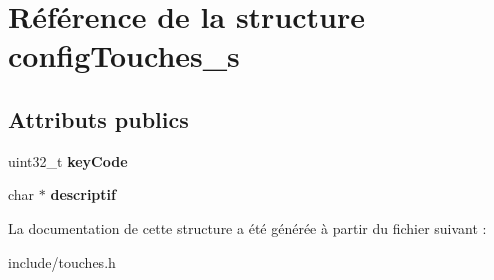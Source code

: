 \hypertarget{structconfigTouches__s}{}\section{Référence de la structure config\+Touches\+\_\+s}
\label{structconfigTouches__s}
\subsection*{Attributs publics}
\begin{DoxyCompactItemize}
\item 
\mbox{\label{structconfigTouches__s_af4b9d9fa7199d941b852eb00e546da13}} 
uint32\+\_\+t {\bfseries key\+Code}
\item 
\mbox{\label{structconfigTouches__s_ac3831fa6578fd9535c12483ab6c50280}} 
char $\ast$ {\bfseries descriptif}
\end{DoxyCompactItemize}


La documentation de cette structure a été générée à partir du fichier suivant \+:\begin{DoxyCompactItemize}
\item 
include/touches.\+h\end{DoxyCompactItemize}
